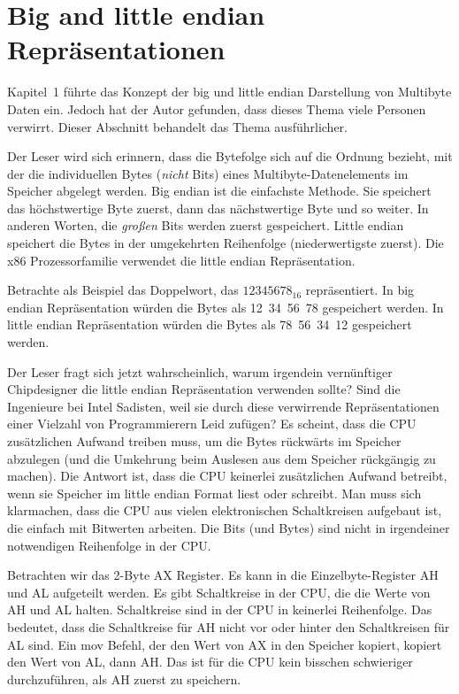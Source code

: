 \section{Big and little endian Repr\"{a}sentationen}

Kapitel~1 f\"{u}hrte das Konzept der big und little endian Darstellung
von Multibyte Daten ein. Jedoch hat der Autor gefunden, dass dieses
Thema viele Personen verwirrt. Dieser Abschnitt behandelt das Thema
ausf\"{u}hrlicher.

Der Leser wird sich erinnern, dass die Bytefolge sich auf die
Ordnung bezieht, mit der die individuellen Bytes (\emph{nicht} Bits)
eines Mul\-ti\-byte-Da\-ten\-e\-le\-ments im Speicher abgelegt
werden. Big endian ist die einfachste Methode. Sie speichert das
h\"{o}chstwertige Byte zuerst, dann das n\"{a}chstwertige Byte und so
weiter. In anderen Worten, die \emph{gro{\ss}en} Bits werden zuerst
gespeichert. Little endian speichert die Bytes in der umgekehrten
Reihenfolge (niederwertigste zuerst). Die x86 Prozessorfamilie
verwendet die little endian Repr\"{a}sentation.

Betrachte als Beispiel das Doppelwort, das $12345678_{16}$
repr\"{a}sentiert. In big endian Repr\"{a}sentation w\"{u}rden die Bytes als
12~34~56~78 gespeichert werden. In little endian Repr\"{a}sentation
w\"{u}rden die Bytes als 78~56~34~12 gespeichert werden.

Der Leser fragt sich jetzt wahrscheinlich, warum irgendein
vern\"{u}nftiger Chipdesigner die little endian Repr\"{a}sentation verwenden
sollte? Sind die Ingenieure bei Intel Sadisten, weil sie durch diese
verwirrende Repr\"{a}sentationen einer Vielzahl von Programmierern Leid
zuf\"{u}gen? Es scheint, dass die CPU zus\"{a}tzlichen Aufwand treiben muss,
um die Bytes r\"{u}ckw\"{a}rts im Speicher abzulegen (und die Umkehrung beim
Auslesen aus dem Speicher r\"{u}ckg\"{a}ngig zu machen). Die Antwort ist,
dass die CPU keinerlei zus\"{a}tzlichen Aufwand betreibt, wenn sie
Speicher im little endian Format liest oder schreibt. Man muss sich
klarmachen, dass die CPU aus vielen elektronischen Schaltkreisen
aufgebaut ist, die einfach mit Bitwerten arbeiten. Die Bits (und
Bytes) sind nicht in irgendeiner notwendigen Reihenfolge in der
CPU\@.

Betrachten wir das 2-Byte {\code AX} Register. Es kann in die
Einzelbyte-Register {\code AH} und {\code AL} aufgeteilt werden. Es
gibt Schaltkreise in der CPU, die die Werte von {\code AH} und
{\code AL} halten. Schaltkreise sind in der CPU in keinerlei
Reihenfolge. Das bedeutet, dass die Schaltkreise f\"{u}r {\code AH}
nicht vor oder hinter den Schaltkreisen f\"{u}r {\code AL} sind. Ein
{\code mov} Befehl, der den Wert von {\code AX} in den Speicher
kopiert, kopiert den Wert von {\code AL}, dann {\code AH}\@. Das ist
f\"{u}r die CPU kein bisschen schwieriger durchzuf\"{u}hren, als {\code AH}
zuerst zu speichern.

